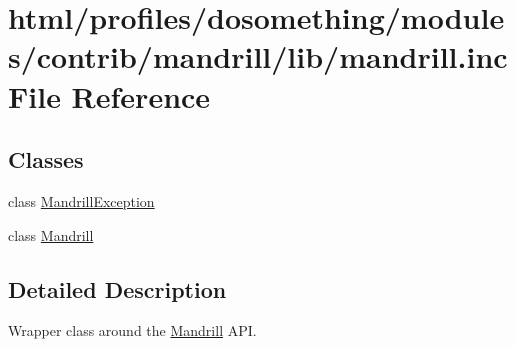 \hypertarget{mandrill_8inc}{
\section{html/profiles/dosomething/modules/contrib/mandrill/lib/mandrill.inc File Reference}
\label{mandrill_8inc}
}
\subsection*{Classes}
\begin{DoxyCompactItemize}
\item 
class \hyperlink{classMandrillException}{MandrillException}
\item 
class \hyperlink{classMandrill}{Mandrill}
\end{DoxyCompactItemize}


\subsection{Detailed Description}
Wrapper class around the \hyperlink{classMandrill}{Mandrill} API. 
